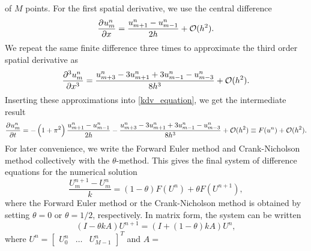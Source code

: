 of $M$ points.
For the first spatial derivative, we use the central difference
\begin{equation*}
	\dpd{u_m^n}{x} = \frac{u_{m+1}^n-u_{m-1}^n}{2 h} + \Oh(h^2).
\end{equation*}
We repeat the same finite difference three times to approximate the third order spatial derivative as 
\begin{equation*}
	\dpd[3]{u_m^n}{x} = \frac{u_{m+3}^n-3u_{m+1}^n+3u_{m-1}^n-u_{m-3}^n}{8 h^3} + \Oh(h^2).
\end{equation*}
Inserting these approximations into \cref{kdv_equation}, we get the intermediate result
\begin{equation*}
	\dpd{u_m^n}{t} = -\left(1+\pi^2\right) \frac{u_{m+1}^n-u_{m-1}^n}{2 h} - \frac{u_{m+3}^n-3u_{m+1}^n+3u_{m-1}^n-u_{m-3}^n}{8 h^3} + \Oh(h^2) \equiv F(u^n) + \Oh(h^2).
\end{equation*}
For later convenience, we write the Forward Euler method and Crank-Nicholson method collectively with the $\theta$-method.
This gives the final system of difference equations for the numerical solution
\begin{equation}\label{theta_method_discretized}
	\frac{U_m^{n+1} - U_m^n}{k} = (1-\theta) F(U^n) + \theta F(U^{n+1}),
\end{equation}
where the Forward Euler method or the Crank-Nicholson method is obtained by setting $\theta = 0$ or $\theta = 1/2$, respectively.
In matrix form, the system can be written
\begin{equation}
	\left(I - \theta k A\right) U^{n+1} = \left(I + \left(1-\theta\right) k A\right) U^n,
	\label{matrixeq}
\end{equation}
where $U^{n} = \begin{bmatrix} U_0^n & \dots & U_{M-1}^n \end{bmatrix}^T$ and $A = $
\newcommand\ca{\color{red}}
\newcommand\cb{\color{magenta}}
\newcommand\cc{\color{blue}}
\newcommand\cd{\color{cyan}}
